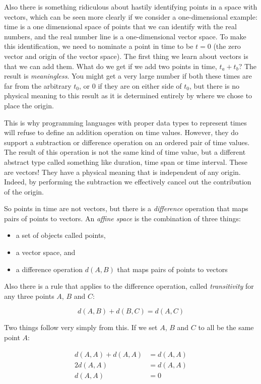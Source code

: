 Also there is something ridiculous about hastily identifying points in a space with vectors, which can be seen more clearly if we consider a one-dimensional example: time is a one dimensional space of points that we can identify with the real numbers, and the real number line is a one-dimensional vector space. To make this identification, we need to nominate a point in time to be $t=0$ (the zero vector and origin of the vector space). The first thing we learn about vectors is that we can add them. What do we get if we add two points in time, $t_a + t_b$? The result is \textit{meaningless}. You might get a very large number if both these times are far from the arbitrary $t_0$, or $0$ if they are on either side of $t_0$, but there is no physical meaning to this result as it is determined entirely by where we chose to place the origin.

This is why programming languages with proper data types to represent times will refuse to define an addition operation on time values. However, they do support a subtraction or difference operation on an ordered pair of time values. The result of this operation is not the same kind of time value, but a different abstract type called something like duration, time span or time interval. These are vectors! They have a physical meaning that is independent of any origin. Indeed, by performing the subtraction we effectively cancel out the contribution of the origin.

So points in time are not vectors, but there is a \textit{difference} operation that maps pairs of points to vectors. An \textit{affine space} is the combination of three things:

\begin{itemize}
    \item a set of objects called points,
    \item a vector space, and
    \item a difference operation $d(A, B)$ that maps pairs of points to vectors
\end{itemize}

Also there is a rule that applies to the difference operation, called \textit{transitivity} for any three points $A$, $B$ and $C$:

$$
d(A, B) + d(B, C) = d(A, C)
$$

Two things follow very simply from this. If we set $A$, $B$ and $C$ to all be the same point $A$:

\begin{equation}
    \begin{split}
    d(A, A) + d(A, A) &= d(A, A) \\
    2d(A, A) &= d(A, A) \\
    d(A, A) &= 0        
    \end{split}
\end{equation}

